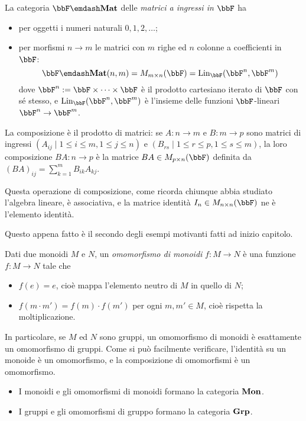 \begin{example}\label{ex_cat_matrici}
	La categoria \(\bbF\emdash\cate{Mat}\) delle \emph{matrici a ingressi in \(\bbF\)} ha
	\begin{itemize}
		\item per oggetti i numeri naturali \(0,1,2,\dots\);
		\item per morfismi \(n\to m\) le matrici con \(m\) righe ed \(n\) colonne a coefficienti in \(\bbF\):
		      \[\bbF\emdash\cate{Mat}(n,m) = M_{m\times n}(\bbF) = \text{Lin}_{\bbF}(\bbF^n,\bbF^m)\]
		      dove \(\bbF^n:=\bbF \times\dots\times\bbF\) è il prodotto cartesiano iterato di \(\bbF\) con sé stesso, e \(\text{Lin}_{\bbF}(\bbF^n,\bbF^m)\) è l'insieme delle funzioni \(\bbF\)-lineari \(\bbF^n\to\bbF^m\).
	\end{itemize}
	La composizione è il prodotto di matrici: se \(A : n\to m\) e \(B : m\to p\) sono matrici di ingressi \((A_{ij}\mid 1\le i\le m,1\le j\le n)\) e \((B_{rs}\mid 1\le r\le p,1\le s\le m)\), la loro composizione \(BA : n\to p\) è la matrice \(BA\in M_{p\times n}(\bbF)\) definita da \((BA)_{ij} = \sum_{k=1}^m B_{ik}A_{kj}\).

	Questa operazione di composizione, come ricorda chiunque abbia studiato l'algebra lineare, è associativa, e la matrice identità \(I_n\in M_{n\times n}(\bbF)\) ne è l'elemento identità.
\end{example}
Questo appena fatto è il secondo degli esempi motivanti fatti ad inizio capitolo.
\begin{example}\label{ex_cat_monoidi}
	Dati due monoidi \(M\) e \(N\), un \emph{omomorfismo di monoidi} \(f:M\to N\) è una funzione \(f:M\to N\) tale che
	\begin{itemize}
		\item \(f(e) = e\), cioè mappa l'elemento neutro di \(M\) in quello di \(N\);
		\item \(f(m\cdot m')=f(m)\cdot f(m')\) per ogni \(m,m'\in M\), cioè rispetta la moltiplicazione.
	\end{itemize}
	In particolare, se \(M\) ed \(N\) sono gruppi, un omomorfismo di monoidi è esattamente un omomorfismo di gruppi.
	Come si può facilmente verificare, l'identità su un monoide è un omomorfismo, e la composizione di omomorfismi è un omomorfismo.
	\begin{itemize}
		\item I monoidi e gli omomorfismi di monoidi formano la categoria \(\mathbf{Mon}\).
		\item I gruppi e gli omomorfismi di gruppo formano la categoria \(\mathbf{Grp}\).
	\end{itemize}
\end{example}

